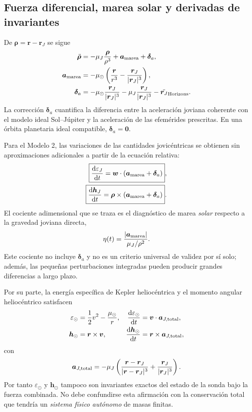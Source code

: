 \documentclass[11pt,a4paper]{article}
\newcommand{\vect}[1]{\bm{#1}}
\newcommand{\dif}{\mathop{}\!\mathrm{d}}
\newcommand{\muS}{\mu_\odot}
\newcommand{\muJ}{\mu_{J}}
\newcommand{\rJ}{\vect r_{J}}
\newcommand{\rV}{\vect r}
\newcommand{\vV}{\vect v}
\begin{document}
\subsection{Fuerza diferencial, marea solar y derivadas de invariantes}
De $\vect\rho=\rV-\rJ$ se sigue
\begin{align}\label{eq:rel_acc}
\ddot{\vect\rho}
&=-\muJ\frac{\vect\rho}{\rho^3}+\vect a_{\rm marea}+\vect\delta_a,\\
\vect a_{\rm marea}
&= -\muS\left(\frac{\rV}{r^3}-\frac{\rJ}{|\rJ|^3}\right),\\
\vect\delta_a
&=-\muS\frac{\rJ}{|\rJ|^3}
-\muJ\frac{\rJ}{|\rJ|^3}
-\ddot{\rJ}_{\rm Horizons}.
\end{align}
La corrección $\vect\delta_a$ cuantifica la diferencia entre la aceleración joviana coherente con el modelo ideal Sol--Júpiter y la aceleración de las efemérides prescritas. En una órbita planetaria ideal compatible, $\vect\delta_a=\vect0$.

Para el Modelo 2, las variaciones de las cantidades jovicéntricas se obtienen sin aproximaciones adicionales a partir de la ecuación relativa:
\begin{align}\label{eq:derivE}
\boxed{\frac{\dif\varepsilon_J}{\dif t}=\vect w\cdot
(\vect a_{\rm marea}+\vect\delta_a)},\\
\boxed{\frac{\dif\vect h_J}{\dif t}=\vect\rho\times
(\vect a_{\rm marea}+\vect\delta_a)}.
\end{align}
El cociente adimensional que se traza es el diagnóstico de marea \emph{solar} respecto a la gravedad joviana directa,
\begin{equation}\label{eq:tidal}
\eta(t)=\frac{|\vect a_{\rm marea}|}{\muJ/\rho^2}.
\end{equation}
Este cociente no incluye $\vect\delta_a$ y no es un criterio universal de validez por sí solo; además, las pequeñas perturbaciones integradas pueden producir grandes diferencias a largo plazo.

Por su parte, la energía específica de Kepler heliocéntrica y el momento angular heliocéntrico satisfacen
\begin{align}
\varepsilon_\odot&=\frac12v^2-\frac{\muS}{r},
&\frac{\dif\varepsilon_\odot}{\dif t}
&=\vV\cdot\vect a_{J,\rm total},\\
\vect h_\odot&=\rV\times\vV,
&\frac{\dif\vect h_\odot}{\dif t}
&=\rV\times\vect a_{J,\rm total},
\end{align}
con
\begin{equation}
\vect a_{J,\rm total}=-\muJ\left(
\frac{\rV-\rJ}{|\rV-\rJ|^3}+\frac{\rJ}{|\rJ|^3}\right).
\end{equation}
Por tanto $\varepsilon_\odot$ y $\vect h_\odot$ tampoco son invariantes exactos del estado de la sonda bajo la fuerza combinada. No debe confundirse esta afirmación con la conservación total que tendría un \emph{sistema físico autónomo} de masas finitas.
\end{document}
